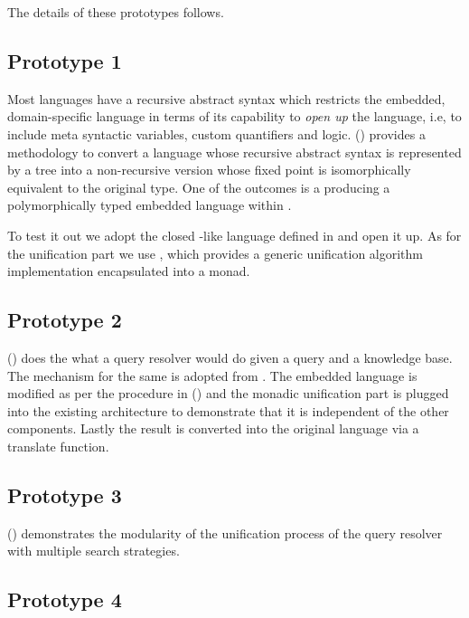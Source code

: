 \documentclass[thesis-solanki.tex]{subfiles}
\begin{document}
The details of these prototypes follows.

\subsection{Prototype 1}

Most languages have a recursive abstract syntax which restricts the embedded, domain-specific language
  in terms of its capability to \textit{open up} the language, i.e, to include meta syntactic
  variables, custom quantifiers and logic.
  () provides a methodology to convert a language whose recursive abstract
  syntax is represented by a tree into a non-recursive version whose fixed point is isomorphically equivalent to
  the original type.
  One of the outcomes is a producing a polymorphically typed embedded language within .

  To test it out we adopt the closed -like language defined in \cite{prolog-lib} and open it up.
  As for the unification part we use \cite{unification-fd-lib}, which provides a generic unification algorithm
  implementation encapsulated into a monad.


\subsection{Prototype 2}

  () does the what a  query resolver would do given a
  query and a knowledge base.
  The mechanism for the same is adopted from \cite{prolog-lib}.
  The embedded language is modified as per the procedure in () and the
  monadic unification part is plugged into the existing architecture to demonstrate that it is independent of the
  other components.
  Lastly the result is converted into the original language via a translate function.

\subsection{Prototype 3}

  () demonstrates the modularity of the unification process of the query
  resolver with multiple search strategies.

\subsection{Prototype 4}
\end{document}
